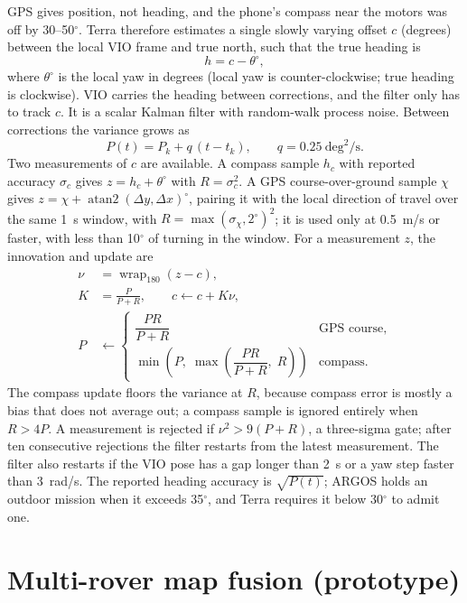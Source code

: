 GPS gives position, not heading, and the phone's compass near the motors was off by 30--50$^\circ$.
Terra therefore estimates a single slowly varying offset $c$ (degrees) between the local VIO frame and true north, such that the true heading is
\begin{equation}
  h = c - \theta^{\circ},
\end{equation}
where $\theta^{\circ}$ is the local yaw in degrees (local yaw is counter-clockwise; true heading is clockwise).
VIO carries the heading between corrections, and the filter only has to track $c$.
It is a scalar Kalman filter with random-walk process noise.
Between corrections the variance grows as
\begin{equation}
  P(t) = P_k + q\,(t - t_k), \qquad q = 0.25~\text{deg}^2/\text{s}.
\end{equation}
Two measurements of $c$ are available.
A compass sample $h_c$ with reported accuracy $\sigma_c$ gives $z = h_c + \theta^{\circ}$ with $R = \sigma_c^2$.
A GPS course-over-ground sample $\chi$ gives $z = \chi + \operatorname{atan2}(\Delta y, \Delta x)^{\circ}$, pairing it with the local direction of travel over the same 1~s window, with $R = \max(\sigma_\chi, 2^\circ)^2$; it is used only at 0.5~m/s or faster, with less than 10$^\circ$ of turning in the window.
For a measurement $z$, the innovation and update are
\begin{align}
  \nu &= \operatorname{wrap}_{180}(z - c), \\
  K &= \frac{P}{P + R}, \qquad c \leftarrow c + K\nu, \\
  P &\leftarrow \begin{cases} \dfrac{PR}{P + R} & \text{GPS course,} \\[1ex] \min\!\left(P,\; \max\!\left(\dfrac{PR}{P + R},\; R\right)\right) & \text{compass.} \end{cases}
\end{align}
The compass update floors the variance at $R$, because compass error is mostly a bias that does not average out; a compass sample is ignored entirely when $R > 4P$.
A measurement is rejected if $\nu^2 > 9(P + R)$, a three-sigma gate; after ten consecutive rejections the filter restarts from the latest measurement.
The filter also restarts if the VIO pose has a gap longer than 2~s or a yaw step faster than 3~rad/s.
The reported heading accuracy is $\sqrt{P(t)}$; ARGOS holds an outdoor mission when it exceeds 35$^\circ$, and Terra requires it below 30$^\circ$ to admit one.

\section{Multi-rover map fusion (prototype)}
\label{sec:auto-fusion}

